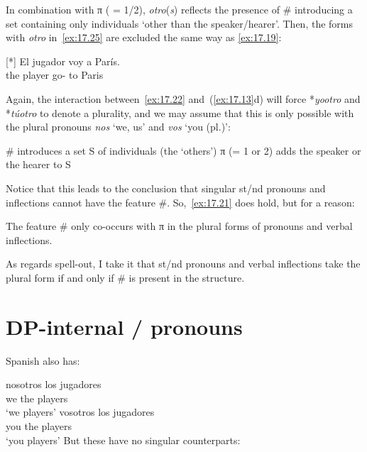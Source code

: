 \documentclass[output=paper]{langsci/langscibook}
\begin{document}
\ea\label{ex:17.26}
    In combination with π ( = 1/2), \emph{otro}(\emph{s}) reflects the presence
    of \# introducing a set containing only individuals ‘other than the
    speaker/hearer’.
\z
Then, the forms with \emph{otro} in~\eqref{ex:17.25} are excluded the same
way as \eqref{ex:17.19}:

\begin{exe}
\exi{\eqref{ex:17.19}}[*]{%
    \gll El jugador voy a París.\\
        the player go-\Fsg{} to Paris\\
    \glt}
\end{exe}
Again, the interaction between~\eqref{ex:17.22} and~(\ref{ex:17.13}d) will
force *\emph{yootro} and *\emph{túotro} to denote a plurality, and we may
assume that this is only possible with the plural pronouns \emph{nos} ‘we, us’
and \emph{vos} ‘you (pl.)’:

\begin{exe}
\exi{\eqref{ex:17.13}}
\begin{xlist}
     \# introduces a set S of individuals (the ‘others’)
     π (= 1 or 2) adds the speaker or the hearer to S
\end{xlist}
\end{exe}
Notice that this leads to the conclusion that singular \First{}st/\Second{}nd
pronouns and inflections cannot have the feature \#. So,~\eqref{ex:17.21} does
hold, but for a reason:

\begin{exe}
\exi{\eqref{ex:17.21}}
    The feature \# only co-occurs with π in the plural forms of pronouns
    and verbal inflections.
\end{exe}
As regards spell-out, I take it that \First{}st/\Second{}nd pronouns and verbal
inflections take the plural form if and only if \# is present in the structure.

\section{DP-internal \First/\Spl{} pronouns}\label{sec:17.6}

Spanish also has:

\ea\label{ex:17.27}
    \ea
    \gll    nosotros los jugadores\\
            we          the players\\
    \glt    \enquote*{we players}
    \ex
    \gll    vosotros los jugadores\\
            you          the players\\
    \glt    \enquote*{you players}
    \z
\z
But these have no singular counterparts:
\end{document}
